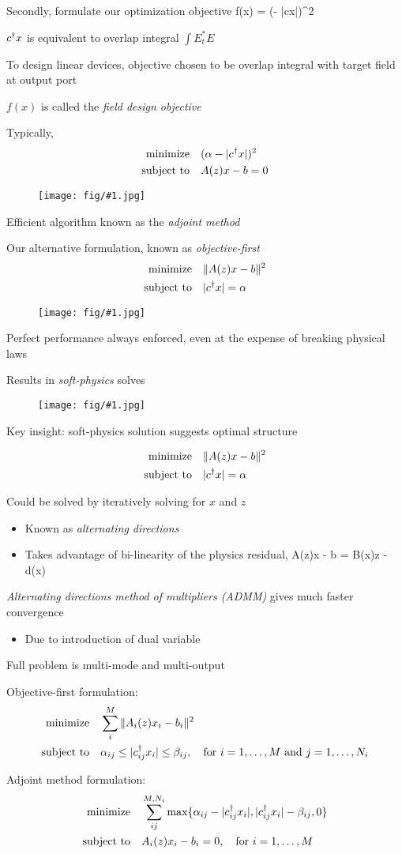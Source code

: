 \documentclass[landscape]{foils}
\newcommand{\myfig}[1]{
    \begin{figure}[!h]
    \centerline{\texttt{[image: fig/\#1.jpg]}}
    \end{figure}
}
\newcommand{\BI}{\begin{itemize}\item}
\newcommand{\I}{\item}
\newcommand{\EI}{\end{itemize}}
\begin{document}
\I  Secondly, formulate our optimization objective
\BE f(x) = (\alpha - |c\T x|)^2 \EE
\I  $c^\dagger x$ is equivalent to overlap integral $\int E_t^* E$
\I  To design linear devices, objective chosen to be 
    overlap integral with target field at output port
\I  $f(x)$ is called the \emph{field design objective}
\vfill
\newpage

\I  Typically,
\begin{align*}
    \operatorname*{\text{minimize}\quad} & (\alpha - |c^\dagger x|)^2 \\
    \text{subject to}\quad & A(z)x - b = 0
\end{align*}
\myfig{placeholder}
\I  Efficient algorithm known as the \emph{adjoint method}
\newpage

\I  Our alternative formulation, known as \emph{objective-first}
\begin{align*}
    \operatorname*{\text{minimize}\quad} & \|A(z)x - b\|^2 \\
    \text{subject to}\quad & |c^\dagger x| = \alpha 
\end{align*}
\myfig{placeholder}
\I  Perfect performance always enforced, 
    even at the expense of breaking physical laws
\newpage

\I  Results in \emph{soft-physics} solves
\myfig{placeholder}
\I  Key insight: soft-physics solution suggests optimal structure
\newpage

\begin{align*}
    \operatorname*{\text{minimize}\quad} & \|A(z)x - b\|^2 \\
    \text{subject to}\quad & |c^\dagger x| = \alpha 
\end{align*}
\I  Could be solved by iteratively solving for $x$ and $z$
    \BI Known as \emph{alternating directions}
    \I  Takes advantage of bi-linearity of the physics residual,
    \BE A(z)x - b = B(x)z - d(x) \EE \EI
\I  \emph{Alternating directions method of multipliers (ADMM)}
    gives much faster convergence
    \BI Due to introduction of dual variable \EI
\vfill
\newpage

\I  Full problem is multi-mode and multi-output
\I  Objective-first formulation:
\begin{align*}
    \operatorname*{\text{minimize}\quad} & \sum_i^M \|A_i(z)x_i - b_i\|^2 \\
    \text{subject to}\quad & \alpha_{ij} \le |c_{ij}^\dagger x_i| \le \beta_{ij}, \quad
        \text{for $i = 1, \ldots, M$ and $j = 1, \ldots, N_i$}
\end{align*}
\I  Adjoint method formulation:
\begin{align*}
    \operatorname*{\text{minimize}\quad} & \sum_{ij}^{M,N_i} \max\{\alpha_{ij}-|c_{ij}^\dagger x_i|, 
                                        |c_{ij}^\dagger x_i|-\beta_{ij}, 0\} \\
    \text{subject to}\quad & A_i(z) x_i - b_i = 0, \quad
        \text{for $i = 1, \ldots, M$}
\end{align*}
\newpage
\end{document}
